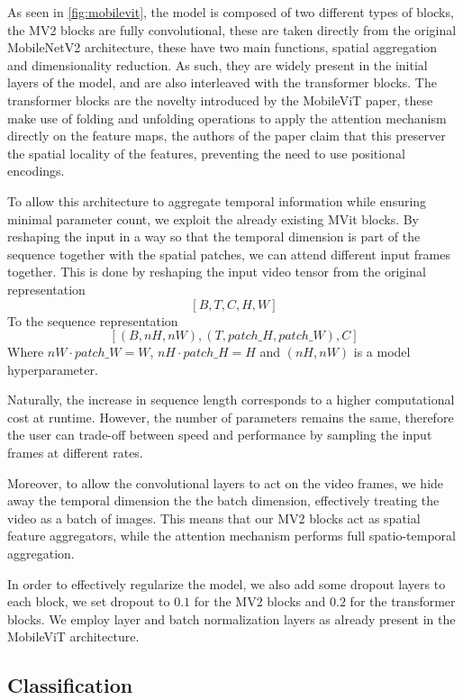 \documentclass{IEEEtran}
\begin{document}
As seen in \cref{fig:mobilevit}, the model is composed of two different types of blocks, the MV2 blocks are fully convolutional, these are 
taken directly from the original MobileNetV2\cite{sandler_mobilenetv2_2018} architecture, these have two main functions, spatial aggregation and dimensionality reduction. As such, they are widely present in the initial layers of the model, and are also interleaved with the transformer blocks. The transformer blocks are the novelty introduced by the MobileViT paper, these make use of folding and unfolding operations to apply the attention
mechanism directly on the feature maps, the authors of the paper claim that this preserver the spatial locality of the features, preventing the need to use positional encodings.

To allow this architecture to aggregate temporal information while ensuring minimal parameter count, we exploit the already existing MVit blocks. By reshaping the input in a way so that the temporal dimension is part of the sequence together with the spatial patches, we can attend different input frames together. This is done by reshaping the input video tensor from the original representation \[[B, T, C, H, W]\] To the sequence representation \[[(B, nH, nW), (T, patch\_H, patch\_W), C]\]
Where $nW \cdot  patch\_W = W$, $nH \cdot patch\_H = H$ and $(nH, nW)$ is a model hyperparameter.

Naturally, the increase in sequence length corresponds to a higher computational cost at runtime. However, the number of parameters remains the same, therefore the user can trade-off between speed and performance by sampling the input frames at different rates.

Moreover, to allow the convolutional layers to act on the video frames, we hide away the temporal dimension the the batch dimension, effectively treating the video as a batch of images. This means that our MV2 blocks act as spatial feature aggregators, while the attention mechanism performs full spatio-temporal aggregation.

In order to effectively regularize the model, we also add some dropout layers to each block, we set dropout to $0.1$ for the MV2 blocks and $0.2$ for the transformer blocks. We employ layer and batch normalization layers as already present in the MobileViT architecture.

\subsection{Classification}
\end{document}
